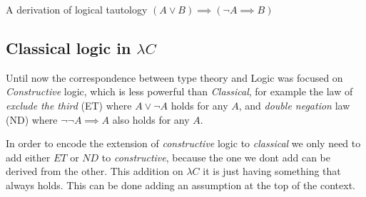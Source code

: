 \documentclass[12pt, a4paper]{article}
\begin{document}
\begin{flagderiv}
    \caption{A derivation of logical tautology $(A \lor B) \implies (\neg A \implies B)$}
\end{flagderiv}


\subsection{Classical logic in \texorpdfstring{$\lambda C$}{}}
Until now the correspondence between type theory and Logic was focused on \textit{Constructive} logic, which is less powerful than \textit{Classical}, for example
the law of \textit{exclude the third} (ET) where $A \lor \neg A$ holds for any $A$, and \textit{double negation} law (ND) where $\neg\neg A \implies A$ also holds for any $A$.

In order to encode the extension of \textit{constructive} logic to \textit{classical} we only need to add either $ET$ or $ND$ to \textit{constructive}, because the one we dont add
can be derived from the other. This addition on $\lambda C$ it is just having something that always holds. This can be done adding an assumption at the top 
of the context.
\end{document}
